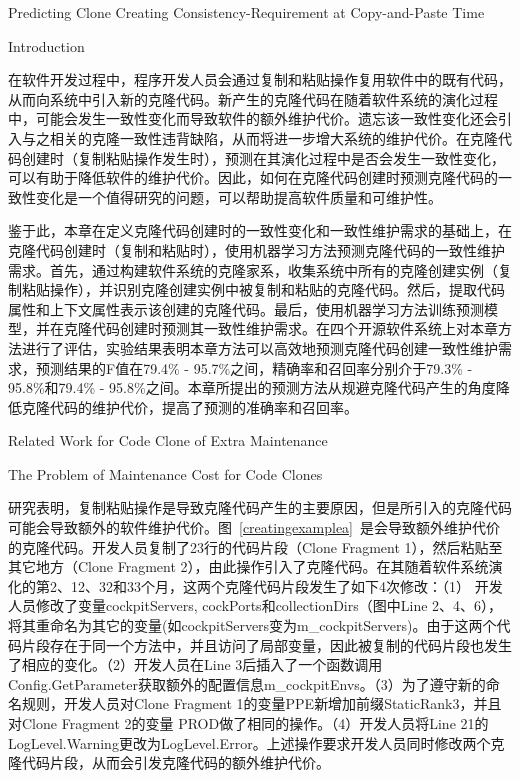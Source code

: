
{Predicting Clone Creating Consistency-Requirement at Copy-and-Paste Time}

{Introduction}

在软件开发过程中，程序开发人员会通过复制和粘贴操作复用软件中的既有代码，从而向系统中引入新的克隆代码。新产生的克隆代码在随着软件系统的演化过程中，可能会发生一致性变化而导致软件的额外维护代价。遗忘该一致性变化还会引入与之相关的克隆一致性违背缺陷，从而将进一步增大系统的维护代价。在克隆代码创建时（复制粘贴操作发生时），预测在其演化过程中是否会发生一致性变化，可以有助于降低软件的维护代价。因此，如何在克隆代码创建时预测克隆代码的一致性变化是一个值得研究的问题，可以帮助提高软件质量和可维护性。

鉴于此，本章在定义克隆代码创建时的一致性变化和一致性维护需求的基础上，在克隆代码创建时（复制和粘贴时），使用机器学习方法预测克隆代码的一致性维护需求。首先，通过构建软件系统的克隆家系，收集系统中所有的克隆创建实例（复制粘贴操作），并识别克隆创建实例中被复制和粘贴的克隆代码。然后，提取代码属性和上下文属性表示该创建的克隆代码。最后，使用机器学习方法训练预测模型，并在克隆代码创建时预测其一致性维护需求。在四个开源软件系统上对本章方法进行了评估，实验结果表明本章方法可以高效地预测克隆代码创建一致性维护需求，预测结果的F值在79.4\% - 95.7\%之间，精确率和召回率分别介于79.3\% - 95.8\%和79.4\% - 95.8\%之间。本章所提出的预测方法从规避克隆代码产生的角度降低克隆代码的维护代价，提高了预测的准确率和召回率。

{Related Work for Code Clone of Extra Maintenance}

{The Problem of Maintenance Cost for Code Clones}
\label{lab-cloningexamples}

研究表明，复制粘贴操作是导致克隆代码产生的主要原因，但是所引入的克隆代码可能会导致额外的软件维护代价。图~\ref{creatingexamplea}~是会导致额外维护代价的克隆代码。开发人员复制了23行的代码片段（Clone Fragment 1），然后粘贴至其它地方（Clone Fragment 2），由此操作引入了克隆代码。在其随着软件系统演化的第2、12、32和33个月，这两个克隆代码片段发生了如下4次修改：（1） 开发人员修改了变量{cockpitServers, cockPorts}和{collectionDirs}（图中Line 2、4、6），将其重命名为其它的变量(如{cockpitServers}变为{m\_cockpitServers})。由于这两个代码片段存在于同一个方法中，并且访问了局部变量，因此被复制的代码片段也发生了相应的变化。（2）开发人员在Line 3后插入了一个函数调用{Config.GetParameter}获取额外的配置信息{m\_cockpitEnvs}。（3）为了遵守新的命名规则，开发人员对Clone Fragment 1的变量{PPE}新增加前缀{StaticRank3}，并且对Clone Fragment 2的变量{ PROD}做了相同的操作。（4）开发人员将Line 21的{LogLevel.Warning}更改为{LogLevel.Error}。上述操作要求开发人员同时修改两个克隆代码片段，从而会引发克隆代码的额外维护代价。

